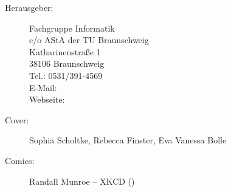 
\begin{description}
\item[Herausgeber:]
	Fachgruppe Informatik\\
	c/o AStA der TU Braunschweig\\
	Katharinenstraße 1\\
	38106 Braunschweig\\
	Tel.: 0531/391-4569\\
	E-Mail: \\
	Webseite: \fginfoUrl
{}
\item[Cover:] Sophia Scholtke, Rebecca Finster, Eva Vanessa Bolle
\item[Comics:] Randall Munroe -- XKCD ()
\end{description}
